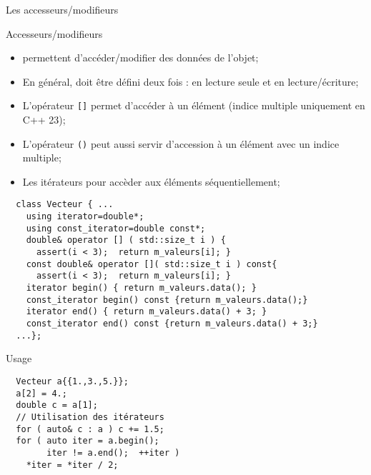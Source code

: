 \documentclass[compress,10pt,aspectratio=169]{beamer}
\begin{document}
  \begin{frame}[fragile]{Les accesseurs/modifieurs}
    \scriptsize
    \vspace*{-6mm}
    \begin{block}{\small Accesseurs/modifieurs}
    \begin{itemize}
    \item permettent d'accéder/modifier des données de l'objet;
    \item En général, doit être défini deux fois : en lecture seule et en lecture/écriture;
    \item L'opérateur \texttt{[]} permet d'accéder à un élément (indice multiple uniquement en C++ 23);
    \item L'opérateur \texttt{()} peut aussi servir d'accession à un élément avec un indice multiple;
    \item Les itérateurs pour accèder aux éléments séquentiellement;
    \end{itemize}
    \end{block}
    \begin{minipage}{0.59\textwidth}
    \begin{verbatim}
  class Vecteur { ...
    using iterator=double*;
    using const_iterator=double const*;
    double& operator [] ( std::size_t i ) {
      assert(i < 3);  return m_valeurs[i]; }
    const double& operator []( std::size_t i ) const{
      assert(i < 3);  return m_valeurs[i]; }
    iterator begin() { return m_valeurs.data(); }
    const_iterator begin() const {return m_valeurs.data();}
    iterator end() { return m_valeurs.data() + 3; }
    const_iterator end() const {return m_valeurs.data() + 3;}
  ...};
  \end{verbatim}
  \end{minipage}\hfill
  \begin{minipage}{0.38\textwidth}
  \begin{block}{\small Usage}
  \begin{verbatim}
  Vecteur a{{1.,3.,5.}};
  a[2] = 4.;
  double c = a[1];
  // Utilisation des itérateurs
  for ( auto& c : a ) c += 1.5;
  for ( auto iter = a.begin(); 
        iter != a.end();  ++iter )
    *iter = *iter / 2;
  \end{verbatim}
  \end{block}
  \end{minipage}
  \end{frame}
    
\end{document}

